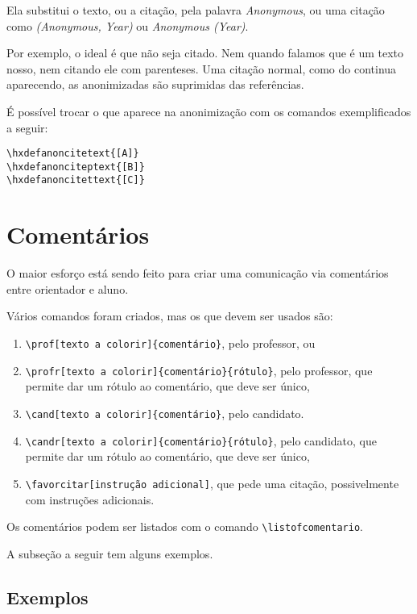 \documentclass{article}
\begin{document}
    Ela substitui o texto, ou a citação, pela palavra \textit{Anonymous}, ou uma citação como \textit{(Anonymous, Year)} ou \textit{Anonymous (Year)}.
    
    Por exemplo, o ideal é que  não seja citado. Nem quando falamos que  é um texto nosso, nem citando ele com parenteses. Uma citação normal, como do \citet{Juran2010} continua aparecendo, as anonimizadas são suprimidas das referências.
    
    É possível trocar o que aparece na anonimização com os comandos exemplificados a seguir:
    \begin{verbatim}
\hxdefanoncitetext{[A]}
\hxdefanonciteptext{[B]}
\hxdefanoncitettext{[C]}
    \end{verbatim}
    
    \section{Comentários}
    
    O maior esforço está sendo feito para criar uma comunicação via comentários entre orientador e aluno.
    
    Vários comandos foram criados, mas os que devem ser usados são:
    \begin{enumerate}
        \item \verb!\prof[texto a colorir]{comentário}!, pelo professor, ou
        \item \verb!\profr[texto a colorir]{comentário}{rótulo}!, pelo professor, que permite dar um rótulo ao comentário, que deve ser único,
        \item \verb!\cand[texto a colorir]{comentário}!, pelo candidato.
        \item \verb!\candr[texto a colorir]{comentário}{rótulo}!, pelo candidato, que permite dar um rótulo ao comentário, que deve ser único,
        \item \verb!\favorcitar[instrução adicional]!, que pede uma citação, possivelmente com instruções adicionais.
    \end{enumerate}
    
    Os comentários podem ser listados com o comando \verb!\listofcomentario!.
    
    A subseção a seguir  tem alguns exemplos.
    
    \subsection{Exemplos}
    
\end{document}
